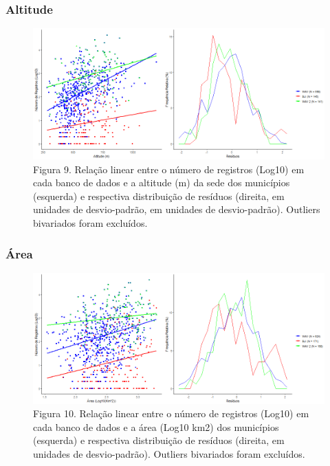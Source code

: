 \texto

\newpage

\subsubsection{Altitude}

\begin{figure}[h!]
\centering
\includegraphics[width = 15cm]{Imagens/31133.png}
\\{\scriptsize Figura 9. Relação linear entre o número de registros (Log10) em cada banco de dados e a altitude (m) da sede dos municípios (esquerda) e respectiva distribuição de resíduos (direita, em unidades de desvio-padrão, em unidades de desvio-padrão). Outliers bivariados foram excluídos. }
\end{figure}


\subsubsection{Área}


\begin{figure}[h!]
\centering
\includegraphics[width = 15cm]{Imagens/31233.png}
\\{\scriptsize Figura 10. Relação linear entre o número de registros (Log10) em cada banco de dados e a área (Log10 km2) dos municípios (esquerda) e respectiva distribuição de resíduos (direita, em unidades de desvio-padrão). Outliers bivariados foram excluídos.}
\end{figure}

